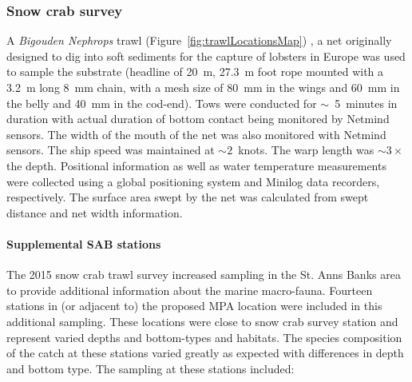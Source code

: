 \documentclass[letterpaper,portrait,11pt]{scrartcl}
\numberwithin{equation}{section}		%
\numberwithin{figure}{section}		%
\numberwithin{table}{section}				%
\newcommand{\ecomod}{\string~/ecomod_data/}   %
\begin{document}





\subsubsection{Snow crab survey}
\label{(se:snowcrab)}

A \textit{Bigouden Nephrops} trawl (Figure~\ref{fig:trawlLocationsMap}) , a net originally designed to dig into soft sediments for the capture of lobsters in Europe was used to sample the substrate (headline of 20~m, 27.3~m foot rope mounted with a 3.2~m long 8~mm chain, with a mesh size of 80~mm in the wings and 60~mm in the belly and 40~mm in the cod-end). Tows were conducted for $\sim$~5~minutes in duration with actual duration of bottom contact being monitored by Netmind sensors. The width of the mouth of the net was also monitored with Netmind sensors. The ship speed was maintained at $\sim 2$~knots. The warp length was $\sim 3 \times$ the depth. Positional information as well as water temperature measurements were collected using a global positioning system and Minilog data recorders, respectively. The surface area swept by the net was calculated from swept distance and net width information.

\paragraph{Supplemental SAB stations}

The 2015 snow crab trawl survey increased sampling in the St. Anns Banks area to provide additional information about the marine macro-fauna. Fourteen stations in (or adjacent to) the proposed MPA location were included in this additional sampling. These locations were close to snow crab survey station and represent varied depths and bottom-types and habitats. The species composition of the catch at these stations varied greatly as expected with differences in depth and bottom type. The sampling at these stations included:
\end{document}
